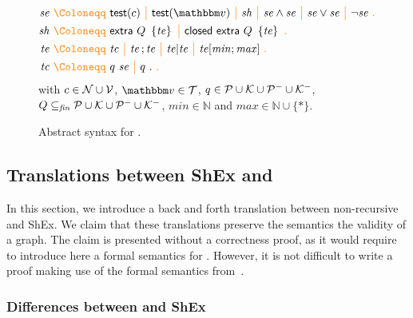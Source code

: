 \begin{figure}[h]
\begin{align*}
  \stse
\gDef
  &     \shexhasvalue(c)
  \gMid \shextest(\text{$\vtype$})
  \gMid \stshape
  \gMid \stse \land \stse
  \gMid \stse \lor \stse
  \gMid \neg \stse
\gEnd \\
  \stshape
\gDef
  &     \stextra\ Q\ \shexneigh{\stte}
  \gMid \stclosed\ \stextra\ Q\ \shexneigh{\stte}
\gEnd \\
  \stte
\gDef
  &     \sttc
  \gMid \stte \shexeach \stte
  \gMid \stte \!\shexone\! \stte
  \gMid \stte {[\mathit{min}; \mathit{max}]}
\gEnd \\
  \sttc
\gDef
  &     q\ \stse
  \gMid q\ .
\gEnd
\end{align*}
with $c \in \mathcal{N} \cup \mathcal{V}$, $\vtype \in \ValueTypes$, $q \in \mathcal{P}
\cup \mathcal{K} \cup \mathcal{P}^{-} \cup \mathcal{K}^{-}$, $Q \subseteq_{\mathit{fin}}
\mathcal{P} \cup \mathcal{K} \cup \mathcal{P}^{-} \cup \mathcal{K}^{-}$, $\mathit{min} \in
\mathbb{N}$ and $\mathit{max} \in \mathbb{N} \cup \{*\}$.
\caption{\label{fig:app-standard-shex-syntax}%
  Abstract syntax for \stshex.}
\end{figure}


\subsection{Translations between ShEx and \stshex}

In this section, we introduce a back and forth translation between non-recursive
\stshex and ShEx.
We claim that these translations preserve the semantics \wrt the validity of a
graph.
The claim is presented without a correctness proof, as it
would require to introduce here a formal semantics for \stshex.
However, it is not difficult to write a proof making use of the formal semantics
from~\cite{BGP17}.


\subsubsection{Differences between \stshex and ShEx}

